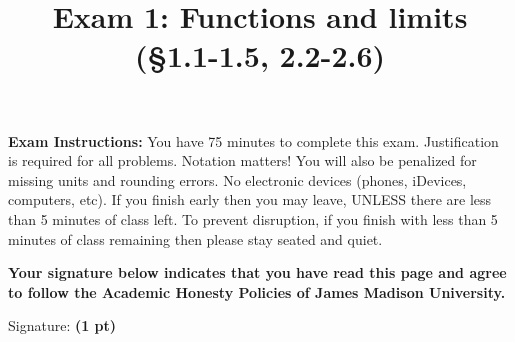 \documentclass[12pt, addpoints]{exam/exam}
\title{\vspace{-8pc}
\vfill{\Huge
	\bf Exam 1: Functions and limits \\ (\S1.1-1.5, 2.2-2.6)} 
	}
\date{}
\newcommand{\1}{^{-1}}
\theoremstyle{plain}
\begin{document}
\begin{coverpages}
\maketitle
\thispagestyle{headandfoot}
\vspace{-4pc}
{\bf Exam Instructions:} You have 75 minutes to complete this exam.  Justification is required for all problems.  Notation matters!  You will also be penalized for missing units and rounding errors.  
No electronic devices (phones, iDevices, computers, etc).  %
If you finish early then you may leave, UNLESS there are less than 5 minutes of class left.  To prevent disruption, if you finish with less than 5 minutes of class remaining then please stay seated and quiet.

\begin{flushright}

\vspace{0.3in}

\vspace{0.3in}
\end{flushright}

\vfill
\textbf{Your signature below indicates that you have read this page and agree to follow the Academic Honesty Policies of James Madison University.}  

\vspace{0.3in}
Signature: {\bf (1 pt)} \underline{\hspace{73ex}}

\newpage
\vspace*{\fill}
\gradetable
\end{coverpages}
\end{document}
